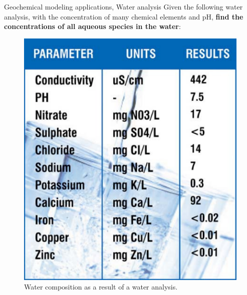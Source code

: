 \begin{frame}{Geochemical modeling applications, Water analysis}
%
Given the following water analysis, with the concentration of many chemical elements and 
pH, \textbf{find the concentrations of all aqueous species in the water}:
\lcol
\begin{figure}
\centering
\includegraphics[height=0.6\textheight]{figures/applications/water-analysis}
\caption*{Water composition as a result of a water analysis.}
\end{figure}
\rcol
%
\begin{figure}
\centering

\end{figure}
\end{frame}
